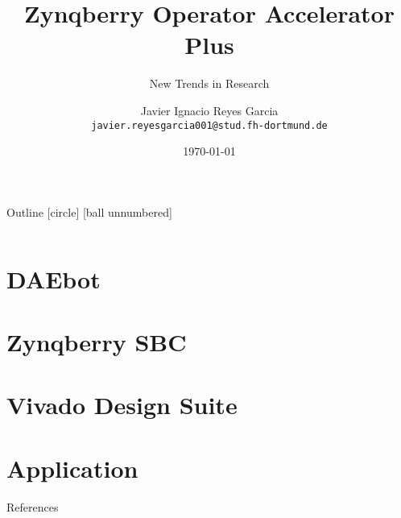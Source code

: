 \documentclass{beamer}
\title{Zynqberry Operator Accelerator Plus}
\subtitle{New Trends in Research}
\author{Javier Ignacio Reyes Garcia \\
	\tiny{\texttt{javier.reyesgarcia001@stud.fh-dortmund.de}}}
\institute{Dortmund University of Applied Sciences and Arts}
\date{\today}
\begin{document}
\maketitle

\begin{frame}{Outline}
	[circle]
	[ball unnumbered]
	\begin{columns}[t]
		\begin{column}{.5\textwidth}
				\tableofcontents[sections={1-2}]
		\end{column}
		\begin{column}{.5\textwidth}
				\tableofcontents[sections={3-4}]
		\end{column}
	\end{columns}
\end{frame}


\section{DAEbot}


\section{Zynqberry SBC}


\section{Vivado Design Suite}


\section{Application}


\begin{frame}[allowframebreaks]{References}
	\printbibliography
	\nocite{*}
\end{frame}
\end{document}
